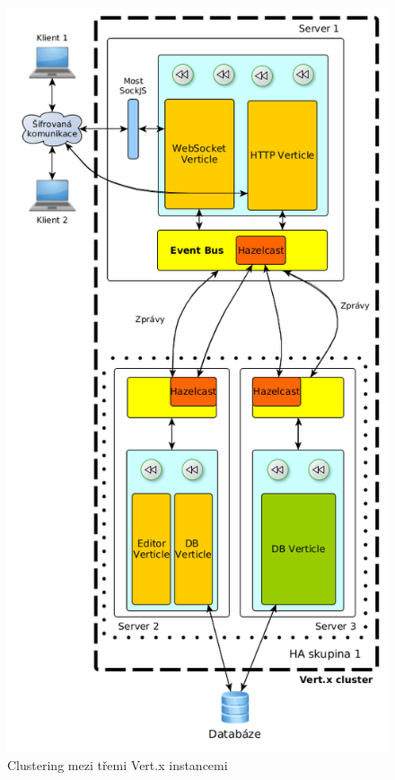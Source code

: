 \begin{figure}
\begin{centering}
\includegraphics[scale=0.5]{obrazky/instance4_eventbus_geolocation}
\par\end{centering}
\caption{Clustering mezi třemi Vert.x instancemi \label{fig:instance4_eventbus_geolocation}}
\end{figure}

